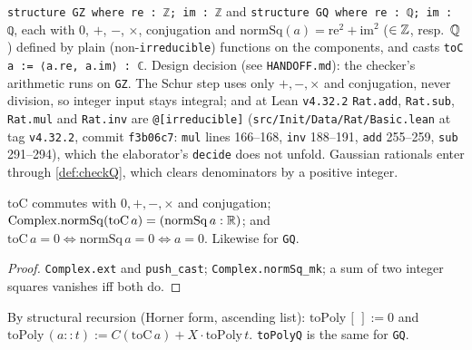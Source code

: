\begin{definition}\label{def:GZ}
\texttt{structure GZ where re : ℤ; im : ℤ} and \texttt{structure GQ where re : ℚ; im : ℚ},
each with $0$, $+$, $-$, $\times$, conjugation and
$\mathrm{normSq}(a)=\mathrm{re}^2+\mathrm{im}^2$ ($\in\mathbb{Z}$, resp.\ $\mathbb{Q}$) defined
by plain (non-\texttt{irreducible}) functions on the components, and casts
\texttt{toC a := ⟨a.re, a.im⟩ : ℂ}.
Design decision (see \texttt{HANDOFF.md}): the checker's arithmetic runs on
\texttt{GZ}. The Schur step uses only $+,-,\times$ and conjugation, never
division, so integer input stays integral; and at Lean \texttt{v4.32.2}
\texttt{Rat.add}, \texttt{Rat.sub}, \texttt{Rat.mul} and \texttt{Rat.inv} are
\texttt{@[irreducible]} (\texttt{src/Init/Data/Rat/Basic.lean} at tag \texttt{v4.32.2},
commit \texttt{f3b06c7}: \texttt{mul} lines 166--168, \texttt{inv} 188--191,
\texttt{add} 255--259, \texttt{sub} 291--294), which the elaborator's
\texttt{decide} does not unfold. Gaussian rationals enter through
\ref{def:checkQ}, which clears denominators by a positive integer.
\end{definition}

\begin{lemma}\label{lem:GZ-cast}
$\mathrm{toC}$ commutes with $0,+,-,\times$ and conjugation;
$\mathrm{Complex.normSq}(\mathrm{toC}\,a)=(\mathrm{normSq}\,a:\mathbb{R})$; and
$\mathrm{toC}\,a=0\iff\mathrm{normSq}\,a=0\iff a=0$. Likewise for \texttt{GQ}.
\end{lemma}
\begin{proof}
\texttt{Complex.ext} and \texttt{push\_cast}; \texttt{Complex.normSq\_mk};
a sum of two integer squares vanishes iff both do.
\end{proof}

\begin{definition}\label{def:toPoly}
By structural recursion (Horner form, ascending list):
$\mathrm{toPoly}\,[\,]:=0$ and $\mathrm{toPoly}\,(a::t):=C(\mathrm{toC}\,a)+X\cdot\mathrm{toPoly}\,t$.
\texttt{toPolyQ} is the same for \texttt{GQ}.
\end{definition}

